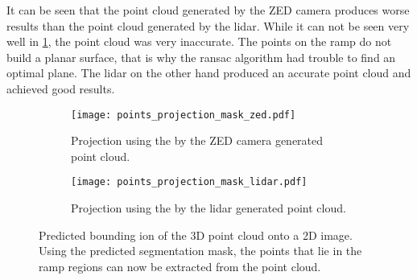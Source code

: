 It can be seen that the point cloud generated by the ZED camera produces worse results than the point cloud generated by the lidar.
While it can not be seen very well in \cref{fig:points_projection_mask_zed}, the point cloud was very inaccurate.
The points on the ramp do not build a planar surface, that is why the \gls{ransac} algorithm had trouble to find an optimal plane.
The \gls{lidar} on the other hand produced an accurate point cloud and achieved good results.

\begin{figure}[t]
    \centering
    \begin{subfigure}{1\textwidth}
        \centering
        \texttt{[image: points\_projection\_mask\_zed.pdf]}
        \caption{Projection using the by the ZED camera generated point cloud.}
        \label{fig:points_projection_mask_zed}
    \end{subfigure}
    
    \begin{subfigure}{1\textwidth}
        \centering
        \texttt{[image: points\_projection\_mask\_lidar.pdf]}
        \caption{Projection using the by the \acrshort{lidar} generated point cloud.}
        \label{fig:points_projection_mask_lidar}
    \end{subfigure}
    \caption[Point cloud extraction using the predicted segmentation mask]{Predicted bounding ion of the 3D point cloud onto a 2D image. Using the predicted segmentation mask, the points that lie in the ramp regions can now be extracted from the point cloud.}
\end{figure}

